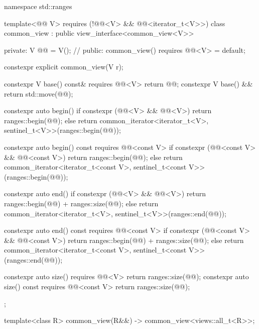 \begin{codeblock}
namespace std::ranges {
  template<@@ V>
    requires (!@@<V> && @@<iterator_t<V>>)
  class common_view : public view_interface<common_view<V>> {
  private:
    V @@ = V();  // \expos
  public:
    common_view() requires @@<V> = default;

    constexpr explicit common_view(V r);

    constexpr V base() const& requires @@<V> { return @@; }
    constexpr V base() && { return std::move(@@); }

    constexpr auto begin() {
      if constexpr (@@<V> && @@<V>)
        return ranges::begin(@@);
      else
        return common_iterator<iterator_t<V>, sentinel_t<V>>(ranges::begin(@@));
    }

    constexpr auto begin() const requires @@<const V> {
      if constexpr (@@<const V> && @@<const V>)
        return ranges::begin(@@);
      else
        return common_iterator<iterator_t<const V>, sentinel_t<const V>>(ranges::begin(@@));
    }

    constexpr auto end() {
      if constexpr (@@<V> && @@<V>)
        return ranges::begin(@@) + ranges::size(@@);
      else
        return common_iterator<iterator_t<V>, sentinel_t<V>>(ranges::end(@@));
    }

    constexpr auto end() const requires @@<const V> {
      if constexpr (@@<const V> && @@<const V>)
        return ranges::begin(@@) + ranges::size(@@);
      else
        return common_iterator<iterator_t<const V>, sentinel_t<const V>>(ranges::end(@@));
    }

    constexpr auto size() requires @@<V> {
      return ranges::size(@@);
    }
    constexpr auto size() const requires @@<const V> {
      return ranges::size(@@);
    }
  };

  template<class R>
    common_view(R&&) -> common_view<views::all_t<R>>;
}
\end{codeblock}


